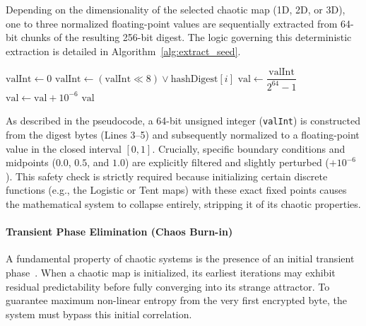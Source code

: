 \documentclass[11pt,a4paper]{report}
\begin{document}
Depending on the dimensionality of the selected chaotic map (1D, 2D, or 3D), one to three normalized floating-point values are sequentially extracted from 64-bit chunks of the resulting 256-bit digest. 
The logic governing this deterministic extraction is detailed in Algorithm~\ref{alg:extract_seed}.

\begin{algorithm}[htbp]
\caption{Normalized Chaotic Value Extraction from SHA-256 Digest}
\label{alg:extract_seed}
\begin{algorithmic}[1]
    \State $\text{valInt} \gets 0$
     
        \State $\text{valInt} \gets (\text{valInt} \ll 8) \lor \text{hashDigest}[i]$
    \EndFor
    \State $\text{val} \gets \dfrac{\text{valInt}}{2^{64} - 1}$ 
     
        \State $\text{val} \gets \text{val} + 10^{-6}$
    \EndIf
    \State \Return $\text{val}$
\EndProcedure
\end{algorithmic}
\end{algorithm}

As described in the pseudocode, a 64-bit unsigned integer (\texttt{valInt}) is constructed from the digest bytes (Lines 3--5) and subsequently normalized to a floating-point value in the closed interval $[0, 1]$. 
Crucially, specific boundary conditions and midpoints ($0.0$, $0.5$, and $1.0$) are explicitly filtered and slightly perturbed ($+10^{-6}$). 
This safety check is strictly required because initializing certain discrete functions (e.g., the Logistic or Tent maps) with these exact fixed points causes the mathematical system to collapse entirely, stripping it of its chaotic properties.

\paragraph{Transient Phase Elimination (Chaos Burn-in)}
A fundamental property of chaotic systems is the presence of an initial transient phase~\cite[p. 464]{logisticTentDefaultParameters}. 
When a chaotic map is initialized, its earliest iterations may exhibit residual predictability before fully converging into its strange attractor. 
To guarantee maximum non-linear entropy from the very first encrypted byte, the system must bypass this initial correlation.
\end{document}
